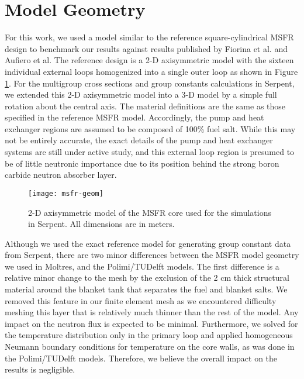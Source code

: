 \section{Model Geometry}

For this work, we used a model similar to the reference square-cylindrical
\gls{MSFR} design to benchmark our results against results published by
Fiorina et al. and Aufiero et al. The reference design is a 2-D axisymmetric
model with the sixteen individual external loops homogenized into a single
outer loop as shown in Figure \ref{fig:msfrgeom}. For the multigroup
cross sections and group constants calculations in Serpent, we extended this
2-D axisymmetric model into a 3-D model by a simple full rotation about the
central axis. The material definitions are the same as those specified in the
reference \gls{MSFR} model. Accordingly, the pump and heat exchanger regions
are assumed to be composed of 100\% fuel salt. While this may not be entirely
accurate, the exact details of the pump and heat exchanger systems are still
under active study, and this external loop region is presumed to be of little
neutronic importance due to its position behind the strong boron carbide
neutron absorber layer.
%
\begin{figure}[t!] 
	\centering
	\texttt{[image: msfr-geom]}
	\caption{2-D axisymmetric model of the \gls{MSFR} core used for the
	simulations in Serpent. All dimensions are in meters.
	\cite{brovchenko_neutronic_2019}}
	\label{fig:msfrgeom}
\end{figure}

Although we used the exact reference model for generating group constant data
from Serpent, there are two minor differences between the \gls{MSFR} model
geometry we used in Moltres, and the Polimi/TUDelft models. The
first difference is a relative
minor change to the mesh by the exclusion of the 2 cm thick structural
material around the blanket tank that separates the fuel and blanket salts.
We removed this feature in our finite element mesh as we encountered
difficulty meshing this layer that is relatively much thinner than the rest of
the model. Any impact on the
neutron flux is expected to be minimal. Furthermore, we solved for the
temperature distribution only in the primary loop and applied homogeneous
Neumann boundary conditions for temperature on the core walls, as was done in
the Polimi/TUDelft models. Therefore, we believe the overall impact on the
results is negligible.

